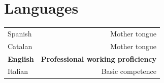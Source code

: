 \documentclass[10pt]{article}
\begin{document}
\section*{Languages}
\begin{tabular}{L!{\VRule}R}
Spanish&Mother tongue\\
Catalan&Mother tongue\\
{\bf English}&{\bf Professional working proficiency}\\
Italian&Basic competence\\
\end{tabular}

\end{document}
